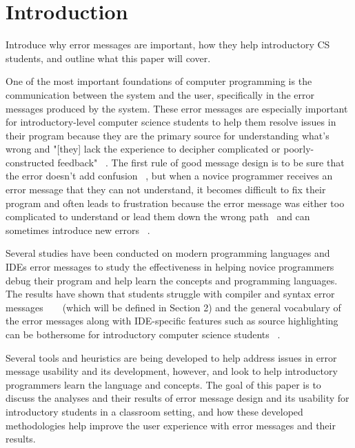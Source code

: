 \documentclass{sig-alternate}
\begin{document}


\section{Introduction}\label{intro}
Introduce why error messages are important, how they help introductory CS students, and outline what this paper will cover.

One of the most important foundations of computer programming is the communication between the system and the user, specifically in the error messages produced by the system. These error messages are especially important for introductory-level computer science students to help them resolve issues in their program because they are the primary source for understanding what's wrong and "[they] lack the experience to decipher complicated or poorly-constructed feedback" ~\cite{Marceau:2011:MEE:1953163.1953308}. The first rule of good message design is to be sure that the error doesn't add confusion ~\cite{Isa:1983:MOE:800045.801583}, but when a novice programmer receives an error message that they can not understand, it becomes difficult to fix their program and often leads to frustration because the error message was either too complicated to understand or lead them down the wrong path~\cite{Marceau:2011:MYL:2048237.2048241} and can sometimes introduce new errors ~\cite{Denny:2014:ESE:2591708.2591748}. 

Several studies have been conducted on modern programming languages and IDEs error messages to study the effectiveness in helping novice programmers debug their program and help learn the concepts and programming languages. The results have shown that students struggle with compiler and syntax error messages ~\cite{Denny:2014:ESE:2591708.2591748} ~\cite{Traver:2010} (which will be defined in Section 2) and the general vocabulary of the error messages along with IDE-specific features such as source highlighting can be bothersome for introductory computer science students ~\cite{Marceau:2011:MYL:2048237.2048241}. 

Several tools and heuristics are being developed to help address issues in error message usability and its development, however, and look to help introductory programmers learn the language and concepts. The goal of this paper is to discuss the analyses and their results of error message design and its usability for introductory students in a classroom setting, and how these developed methodologies help improve the user experience with error messages and their results. 
\end{document}
